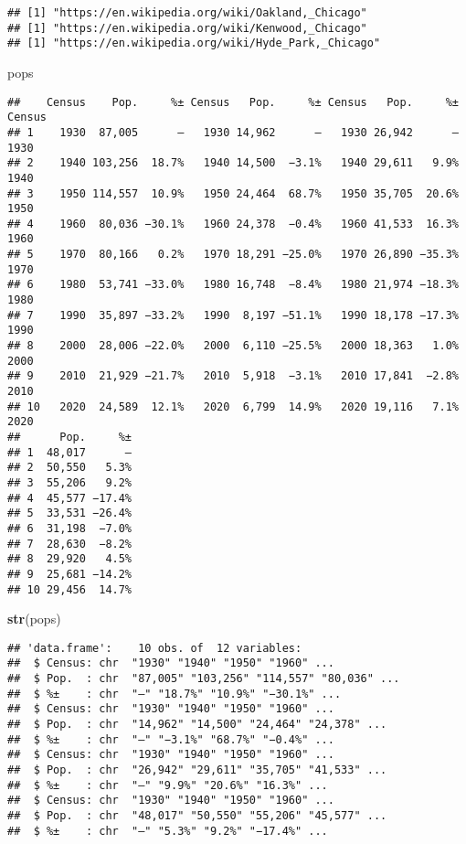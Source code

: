 \documentclass[
]{article}
\newenvironment{Shaded}{\begin{snugshade}}{\end{snugshade}}
\newcommand{\FunctionTok}[1]{\textcolor[rgb]{0.13,0.29,0.53}{\textbf{#1}}}
\newcommand{\NormalTok}[1]{#1}
\begin{document}
\begin{verbatim}
## [1] "https://en.wikipedia.org/wiki/Oakland,_Chicago"
## [1] "https://en.wikipedia.org/wiki/Kenwood,_Chicago"
## [1] "https://en.wikipedia.org/wiki/Hyde_Park,_Chicago"
\end{verbatim}

\begin{Shaded}
\begin{Highlighting}[]
\NormalTok{pops}
\end{Highlighting}
\end{Shaded}

\begin{verbatim}
##    Census    Pop.     %± Census   Pop.     %± Census   Pop.     %± Census
## 1    1930  87,005      —   1930 14,962      —   1930 26,942      —   1930
## 2    1940 103,256  18.7%   1940 14,500  −3.1%   1940 29,611   9.9%   1940
## 3    1950 114,557  10.9%   1950 24,464  68.7%   1950 35,705  20.6%   1950
## 4    1960  80,036 −30.1%   1960 24,378  −0.4%   1960 41,533  16.3%   1960
## 5    1970  80,166   0.2%   1970 18,291 −25.0%   1970 26,890 −35.3%   1970
## 6    1980  53,741 −33.0%   1980 16,748  −8.4%   1980 21,974 −18.3%   1980
## 7    1990  35,897 −33.2%   1990  8,197 −51.1%   1990 18,178 −17.3%   1990
## 8    2000  28,006 −22.0%   2000  6,110 −25.5%   2000 18,363   1.0%   2000
## 9    2010  21,929 −21.7%   2010  5,918  −3.1%   2010 17,841  −2.8%   2010
## 10   2020  24,589  12.1%   2020  6,799  14.9%   2020 19,116   7.1%   2020
##      Pop.     %±
## 1  48,017      —
## 2  50,550   5.3%
## 3  55,206   9.2%
## 4  45,577 −17.4%
## 5  33,531 −26.4%
## 6  31,198  −7.0%
## 7  28,630  −8.2%
## 8  29,920   4.5%
## 9  25,681 −14.2%
## 10 29,456  14.7%
\end{verbatim}

\begin{Shaded}
\begin{Highlighting}[]
\FunctionTok{str}\NormalTok{(pops)}
\end{Highlighting}
\end{Shaded}

\begin{verbatim}
## 'data.frame':    10 obs. of  12 variables:
##  $ Census: chr  "1930" "1940" "1950" "1960" ...
##  $ Pop.  : chr  "87,005" "103,256" "114,557" "80,036" ...
##  $ %±    : chr  "—" "18.7%" "10.9%" "−30.1%" ...
##  $ Census: chr  "1930" "1940" "1950" "1960" ...
##  $ Pop.  : chr  "14,962" "14,500" "24,464" "24,378" ...
##  $ %±    : chr  "—" "−3.1%" "68.7%" "−0.4%" ...
##  $ Census: chr  "1930" "1940" "1950" "1960" ...
##  $ Pop.  : chr  "26,942" "29,611" "35,705" "41,533" ...
##  $ %±    : chr  "—" "9.9%" "20.6%" "16.3%" ...
##  $ Census: chr  "1930" "1940" "1950" "1960" ...
##  $ Pop.  : chr  "48,017" "50,550" "55,206" "45,577" ...
##  $ %±    : chr  "—" "5.3%" "9.2%" "−17.4%" ...
\end{verbatim}
\end{document}

